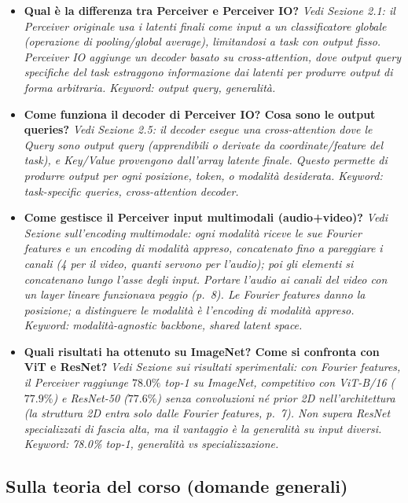 \documentclass[
  11pt,
]{article}
\begin{document}
\begin{itemize}
  \item \textbf{Qual è la differenza tra Perceiver e Perceiver IO?}
  \textit{Vedi Sezione 2.1: il Perceiver originale usa i latenti finali come input a un classificatore globale (operazione di pooling/global average), limitandosi a task con output fisso. Perceiver IO aggiunge un decoder basato su cross-attention, dove output query specifiche del task estraggono informazione dai latenti per produrre output di forma arbitraria. Keyword: output query, generalità.}

  \item \textbf{Come funziona il decoder di Perceiver IO? Cosa sono le output queries?}
  \textit{Vedi Sezione 2.5: il decoder esegue una cross-attention dove le Query sono output query (apprendibili o derivate da coordinate/feature del task), e Key/Value provengono dall'array latente finale. Questo permette di produrre output per ogni posizione, token, o modalità desiderata. Keyword: task-specific queries, cross-attention decoder.}

  \item \textbf{Come gestisce il Perceiver input multimodali (audio+video)?}
  \textit{Vedi Sezione sull'encoding multimodale: ogni modalità riceve le sue Fourier features e un encoding di modalità appreso, concatenato fino a pareggiare i canali (4 per il video, quanti servono per l'audio); poi gli elementi si concatenano lungo l'asse degli input. Portare l'audio ai canali del video con un layer lineare funzionava peggio (p.~8). Le Fourier features danno la posizione; a distinguere le modalità è l'encoding di modalità appreso. Keyword: modalità-agnostic backbone, shared latent space.}

  \item \textbf{Quali risultati ha ottenuto su ImageNet? Come si confronta con ViT e ResNet?}
  \textit{Vedi Sezione sui risultati sperimentali: con Fourier features, il Perceiver raggiunge $78.0\%$ top-1 su ImageNet, competitivo con ViT-B/16 ($77.9\%$) e ResNet-50 ($77.6\%$) senza convoluzioni né prior 2D nell'architettura (la struttura 2D entra solo dalle Fourier features, p.~7). Non supera ResNet specializzati di fascia alta, ma il vantaggio è la generalità su input diversi. Keyword: 78.0\% top-1, generalità vs specializzazione.}

\end{itemize}

\subsection{Sulla teoria del corso (domande generali)}
\end{document}
